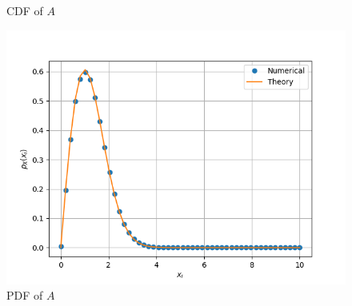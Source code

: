 \documentclass[journal,10pt,twocolumn]{article}
\begin{document}
\begin{enumerate}
\begin{figure}[h]
\caption{CDF of $A$}
\label{fig:rayleigh_cdf}
\end{figure}
\begin{figure}[h]
\centering
\includegraphics[width=\columnwidth]{./chapters/ch4/figs/ch4_sqrtpdf.png}
\caption{PDF of $A$}
\label{fig:rayleigh_pdf}
\end{figure}
%


\end{enumerate}
\end{document}
